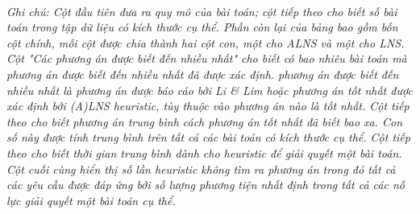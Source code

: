 \begin{table}[caption={Tóm tắt kết quả thu được từ các trường hợp của Li \& Lim (2001)}, label=tab:4.4]
     \\
        \justify
        \textit{Ghi chú: Cột đầu tiên đưa ra quy mô của bài toán; cột tiếp theo cho biết số bài toán trong tập dữ liệu có kích thước cụ thể. Phần còn lại của bảng bao gồm bốn cột chính, mỗi cột được chia thành hai cột con, một cho ALNS và một cho LNS. Cột "Các phương án được biết đến nhiều nhất" cho biết có bao nhiêu bài toán mà phương án được biết đến nhiều nhất đã được xác định. phương án được biết đến nhiều nhất là phương án được báo cáo bởi Li \& Lim hoặc phương án tốt nhất được xác định bởi (A)LNS heuristic, tùy thuộc vào phương án nào là tốt nhất. Cột tiếp theo cho biết phương án trung bình cách phương án tốt nhất đã biết bao xa. Con số này được tính trung bình trên tất cả các bài toán có kích thước cụ thể. Cột tiếp theo cho biết thời gian trung bình dành cho heuristic để giải quyết một bài toán. Cột cuối cùng hiển thị số lần heuristic không tìm ra phương án trong đó tất cả các yêu cầu được đáp ứng bởi số lượng phương tiện nhất định trong tất cả các nỗ lực giải quyết một bài toán cụ thể.}
\end{table}


